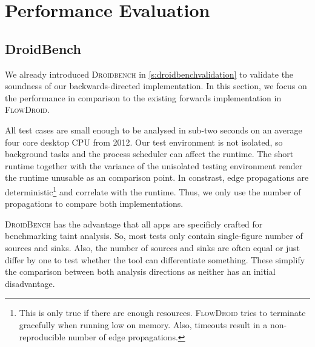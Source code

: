 \documentclass[../draft.tex]{subfiles}
\begin{document}
    \chapter{Performance Evaluation}

    \section{DroidBench}
    We already introduced \textsc{Droidbench} in \autoref{s:droidbenchvalidation} to validate the soundness of our backwards-directed implementation. In this section, we focus on the performance in comparison to the existing forwards implementation in \textsc{FlowDroid}. 

    All test cases are small enough to be analysed in sub-two seconds on an average four core desktop CPU from 2012. Our test environment is not isolated, so background tasks and the process scheduler can affect the runtime. The short runtime together with the variance of the unisolated testing environment render the runtime unusable as an comparison point. In constrast, edge propagations are deterministic\footnote{This is only true if there are enough resources. \textsc{FlowDroid} tries to terminate gracefully when running low on memory. Also, timeouts result in a non-reproducible number of edge propagations.} and correlate with the runtime. Thus, we only use the number of propagations to compare both implementations.

    \textsc{DroidBench} has the advantage that all apps are specificly crafted for benchmarking taint analysis. So, most tests only contain single-figure number of sources and sinks. Also, the number of sources and sinks are often equal or just differ by one to test whether the tool can differentiate something. These simplify the comparison between both analysis directions as neither has an initial disadvantage.
\end{document}
